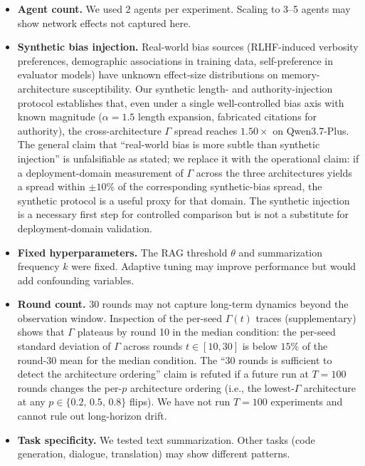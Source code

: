 \documentclass[11pt]{article}
\begin{document}
\begin{itemize}[nosep]
    \item \textbf{Agent count.} We used 2 agents per experiment. Scaling to 3--5 agents may show network effects not captured here.
    \item \textbf{Synthetic bias injection.} Real-world bias sources (RLHF-induced verbosity preferences, demographic associations in training data, self-preference in evaluator models) have unknown effect-size distributions on memory-architecture susceptibility. Our synthetic length- and authority-injection protocol establishes that, even under a single well-controlled bias axis with known magnitude ($\alpha = 1.5$ length expansion, fabricated citations for authority), the cross-architecture $\Gamma$ spread reaches $1.50\times$ on Qwen3.7-Plus. The general claim that ``real-world bias is more subtle than synthetic injection'' is unfalsifiable as stated; we replace it with the operational claim: if a deployment-domain measurement of $\Gamma$ across the three architectures yields a spread within $\pm 10\%$ of the corresponding synthetic-bias spread, the synthetic protocol is a useful proxy for that domain. The synthetic injection is a necessary first step for controlled comparison but is not a substitute for deployment-domain validation.
    \item \textbf{Fixed hyperparameters.} The RAG threshold $\theta$ and summarization frequency $k$ were fixed. Adaptive tuning may improve performance but would add confounding variables.
    \item \textbf{Round count.} 30 rounds may not capture long-term dynamics beyond the observation window. Inspection of the per-seed $\Gamma(t)$ traces (supplementary) shows that $\Gamma$ plateaus by round 10 in the median condition: the per-seed standard deviation of $\Gamma$ across rounds $t \in [10, 30]$ is below $15\%$ of the round-30 mean for the median condition. The ``30 rounds is sufficient to detect the architecture ordering'' claim is refuted if a future run at $T = 100$ rounds changes the per-$p$ architecture ordering (i.e., the lowest-$\Gamma$ architecture at any $p \in \{0.2,\,0.5,\,0.8\}$ flips). We have not run $T = 100$ experiments and cannot rule out long-horizon drift.
    \item \textbf{Task specificity.} We tested text summarization. Other tasks (code generation, dialogue, translation) may show different patterns.
\end{itemize}
\end{document}
